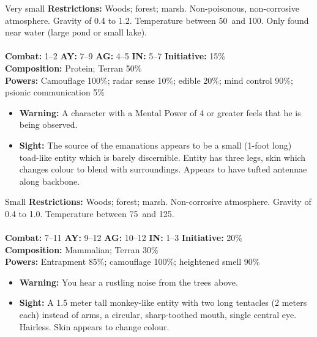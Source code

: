 \hrulefill

\begin{creature}{Very small}
\textbf{Restrictions:} Woods; forest; marsh. Non-poisonous, non-corrosive atmosphere. Gravity of 0.4 to 1.2. Temperature between 50\textdegree\ and 
100\textdegree. Only found near water (large pond or small lake). \\\\
\textbf{Combat:} 1--2 \textbf{AY:} 7--9 \textbf{AG:} 4--5 \textbf{IN:} 5--7 \textbf{Initiative:} 15\% \\
\textbf{Composition:} Protein; Terran 50\% \\
\textbf{Powers:} Camouflage 100\%; radar sense 10\%; edible 20\%; mind control 90\%; psionic communication 5\% 
\begin{itemize}
\item \textbf{Warning:} A character with a Mental Power of 4 or greater feels that he is being observed. 
\item \textbf{Sight:} The source of the emanations appears to be a small (1-foot long) toad-like entity which is barely discernible. Entity has three 
legs, skin which changes colour to blend with surroundings. Appears to have tufted antennae along backbone. 
\end{itemize}
\end{creature}

\hrulefill

\begin{creature}{Small}
\textbf{Restrictions:} Woods; forest; marsh. Non-corrosive
 atmosphere. Gravity of 0.4 to 1.0. Temperature between 75\textdegree\
 and 125\textdegree.\\\\
\textbf{Combat:} 7--11 \textbf{AY:} 9--12 \textbf{AG:} 10--12 \textbf{IN:} 1--3 \textbf{Initiative:} 20\% \\
\textbf{Composition:} Mammalian; Terran 30\% \\
\textbf{Powers:} Entrapment 85\%; camouflage 100\%; heightened smell 90\% 
\begin{itemize}
\item \textbf{Warning:} You hear a rustling noise from the trees above. 
\item \textbf{Sight:} A 1.5 meter tall monkey-like entity with two long tentacles (2 meters each) instead of arms, a circular, sharp-toothed mouth, 
single central eye. Hairless. Skin appears to change colour. 
\end{itemize}
\end{creature}


